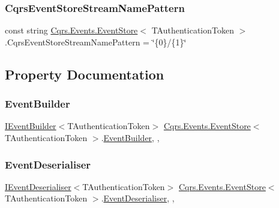 \subsubsection{\texorpdfstring{Cqrs\+Event\+Store\+Stream\+Name\+Pattern}{CqrsEventStoreStreamNamePattern}}
{\footnotesize\ttfamily const string \hyperlink{classCqrs_1_1Events_1_1EventStore}{Cqrs.\+Events.\+Event\+Store}$<$ T\+Authentication\+Token $>$.Cqrs\+Event\+Store\+Stream\+Name\+Pattern = \char`\"{}\{0\}/\{1\}\char`\"{}\hspace{0.3cm}{\ttfamily [protected]}}



\subsection{Property Documentation}
\mbox{\label{classCqrs_1_1Events_1_1EventStore_a05393aedf2eae4b2eeae3977e7f1c6f9_a05393aedf2eae4b2eeae3977e7f1c6f9}} 
\subsubsection{\texorpdfstring{Event\+Builder}{EventBuilder}}
{\footnotesize\ttfamily \hyperlink{interfaceCqrs_1_1Events_1_1IEventBuilder}{I\+Event\+Builder}$<$T\+Authentication\+Token$>$ \hyperlink{classCqrs_1_1Events_1_1EventStore}{Cqrs.\+Events.\+Event\+Store}$<$ T\+Authentication\+Token $>$.\hyperlink{classCqrs_1_1Events_1_1EventBuilder}{Event\+Builder}\hspace{0.3cm}{\ttfamily [get]}, {\ttfamily [set]}, {\ttfamily [protected]}}

\mbox{\label{classCqrs_1_1Events_1_1EventStore_a24f17302c069058e5814dedfb614d599_a24f17302c069058e5814dedfb614d599}} 
\subsubsection{\texorpdfstring{Event\+Deserialiser}{EventDeserialiser}}
{\footnotesize\ttfamily \hyperlink{interfaceCqrs_1_1Events_1_1IEventDeserialiser}{I\+Event\+Deserialiser}$<$T\+Authentication\+Token$>$ \hyperlink{classCqrs_1_1Events_1_1EventStore}{Cqrs.\+Events.\+Event\+Store}$<$ T\+Authentication\+Token $>$.\hyperlink{classCqrs_1_1Events_1_1EventDeserialiser}{Event\+Deserialiser}\hspace{0.3cm}{\ttfamily [get]}, {\ttfamily [set]}, {\ttfamily [protected]}}

